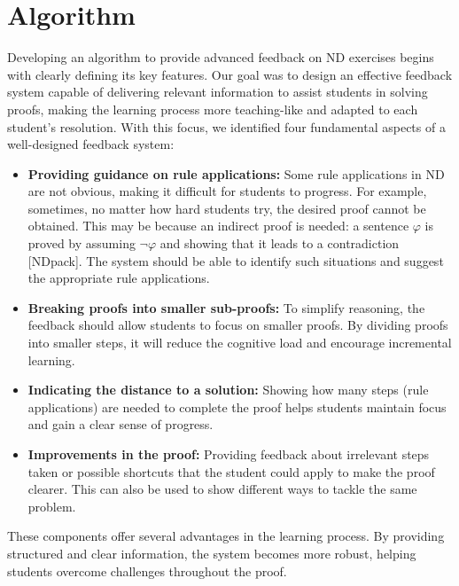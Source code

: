 \documentclass[runningheads]{llncs}
\begin{document}
\section{Algorithm}
Developing an algorithm to provide advanced feedback on ND exercises begins with clearly defining its key features. Our goal was to design an effective feedback system capable of delivering relevant information to assist students in solving proofs, making the learning process more teaching-like and adapted to each student’s resolution. With this focus, we identified four fundamental aspects of a well-designed feedback system:

\begin{itemize}

\item \textbf {Providing guidance on rule applications:} Some rule applications in ND are not obvious, making it difficult for students to progress. For example, sometimes, no matter how hard students try, the desired proof cannot be obtained. This may be because an indirect proof is needed: a sentence \(\varphi\) is proved by assuming \(\neg \varphi\) and showing that it leads to a contradiction [NDpack]. The system should be able to identify such situations and suggest the appropriate rule applications.

\item \textbf {Breaking proofs into smaller sub-proofs:} To simplify reasoning, the feedback should allow students to focus on smaller proofs. By dividing proofs into smaller steps, it will reduce the cognitive load and encourage incremental learning. 

\item \textbf{Indicating the distance to a solution:} Showing how many steps (rule applications) are needed to complete the proof helps students maintain focus and gain a clear sense of progress.

\item \textbf{Improvements in the proof:} Providing feedback about irrelevant steps taken or possible shortcuts that the student could apply to make the proof clearer. This can also be used to show different ways to tackle the same problem.

\end{itemize}

These components offer several advantages in the learning process. By providing structured and clear information, the system becomes more robust, helping students overcome challenges throughout the proof.
\end{document}
